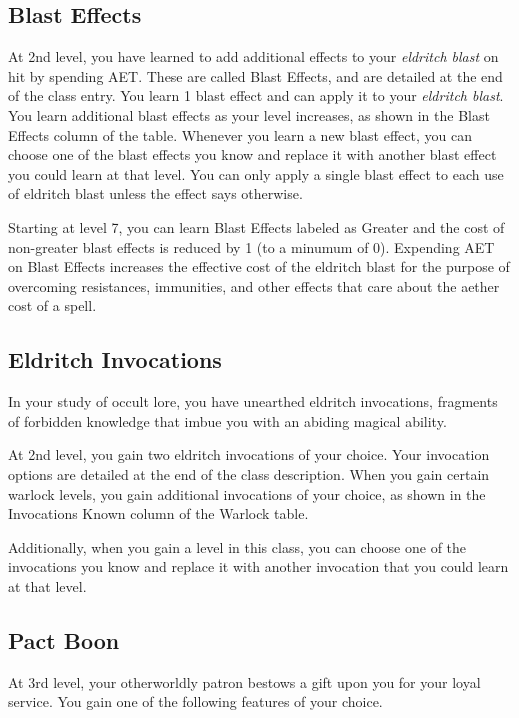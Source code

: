 \subsection{Blast Effects}

At 2nd level, you have learned to add additional effects to your \textit{eldritch blast} on hit by spending AET. These are called Blast Effects, and are detailed at the end of the class entry. You learn 1 blast effect and can apply it to your \textit{eldritch blast}. You learn additional blast effects as your level increases, as shown in the Blast Effects column of the  table. Whenever you learn a new blast effect, you can choose one of the blast effects you know and replace it with another blast effect you could learn at that level. You can only apply a single blast effect to each use of eldritch blast unless the effect says otherwise.

Starting at level 7, you can learn Blast Effects labeled as Greater and the cost of non-greater blast effects is reduced by 1 (to a minumum of 0). Expending AET on Blast Effects increases the effective cost of the eldritch blast for the purpose of overcoming resistances, immunities, and other effects that care about the aether cost of a spell.

\subsection{Eldritch Invocations}

In your study of occult lore, you have unearthed eldritch invocations, fragments of forbidden knowledge that imbue you with an abiding magical ability.

At 2nd level, you gain two eldritch invocations of your choice. Your invocation options are detailed at the end of the class description. When you gain certain warlock levels, you gain additional invocations of your choice, as shown in the Invocations Known column of the Warlock table.

Additionally, when you gain a level in this class, you can choose one of the invocations you know and replace it with another invocation that you could learn at that level.

\subsection{Pact Boon}

At 3rd level, your otherworldly patron bestows a gift upon you for your loyal service. You gain one of the following features of your choice.

